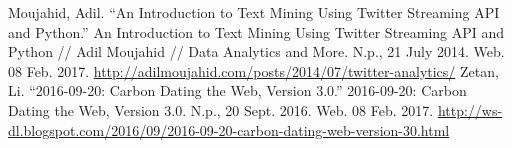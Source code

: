 \documentclass[letterpaper,11pt]{article}
\begin{document}
\clearpage


\clearpage


\begin{thebibliography}{9}
Moujahid, Adil. ``An Introduction to Text Mining Using Twitter Streaming API and Python.'' An Introduction to Text Mining Using Twitter Streaming API and Python // Adil Moujahid // Data Analytics and More. N.p., 21 July 2014. Web. 08 Feb. 2017. \url{http://adilmoujahid.com/posts/2014/07/twitter-analytics/}
Zetan, Li. ``2016-09-20: Carbon Dating the Web, Version 3.0.'' 2016-09-20: Carbon Dating the Web, Version 3.0. N.p., 20 Sept. 2016. Web. 08 Feb. 2017. \url{http://ws-dl.blogspot.com/2016/09/2016-09-20-carbon-dating-web-version-30.html}
\end{thebibliography}
\end{document}
